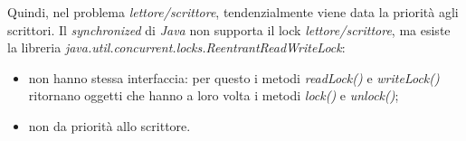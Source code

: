 Quindi, nel problema \textit{lettore/scrittore}, tendenzialmente viene data la priorità agli scrittori.
Il \textit{synchronized} di \textit{Java} non supporta il lock \textit{lettore/scrittore}, ma esiste la libreria \textit{java.util.concurrent.locks.ReentrantReadWriteLock}:
\begin{itemize}
	\item non hanno stessa interfaccia: per questo i metodi \textit{readLock()} e \textit{writeLock()} ritornano oggetti che hanno a loro volta i metodi \textit{lock()} e \textit{unlock()};
	\item non da priorità allo scrittore.
\end{itemize}